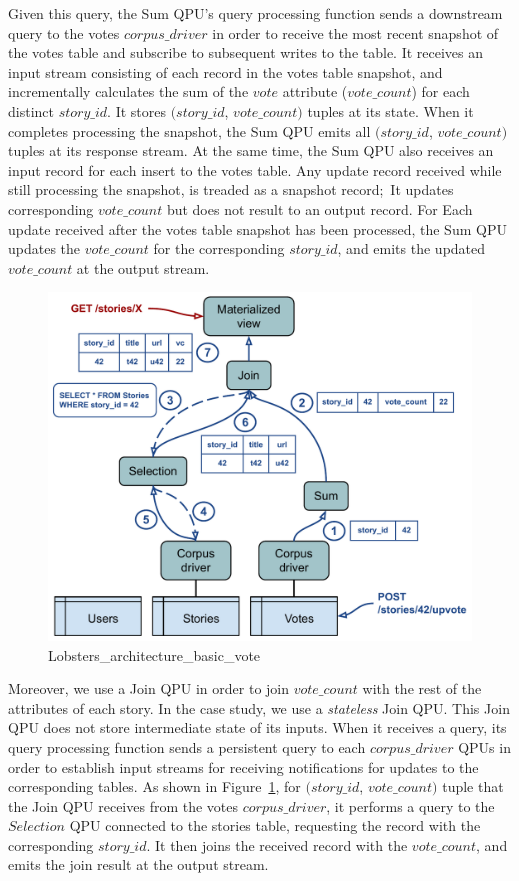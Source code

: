 Given this query, the Sum QPU's query processing function sends a downstream query to the votes $corpus\_driver$
in order to receive the most recent snapshot of the votes table
and subscribe to subsequent writes to the table.
It receives an input stream consisting of each record in the votes table snapshot,
and incrementally calculates the sum of the $vote$ attribute ($vote\_count$) for each distinct $story\_id$.
It stores $(story\_id$, $vote\_count)$ tuples at its state.
When it completes processing the snapshot, the Sum QPU emits all $(story\_id$, $vote\_count)$ tuples at its response stream.
At the same time, the Sum QPU also receives an input record for each insert to the votes table.
Any update record received while still processing the snapshot, is treaded as a snapshot record;\
It updates corresponding $vote\_count$ but does not result to an output record.
For Each update received after the votes table snapshot has been processed, the Sum QPU updates the $vote\_count$ for the
corresponding $story\_id$,
and emits the updated $vote\_count$ at the output stream.

\begin{figure}[t]
  \centering
    \includegraphics[scale=0.5]{./figures/case_studies/lobsters_architecture_basic_vote.pdf}
  \caption{Lobsters\_architecture\_basic\_vote}
  \label{fig:lobsters_architecture_basic_vote}
\end{figure}

\medskip
\noindent
Moreover, we use a Join QPU in order to join $vote\_count$ with the rest of the attributes of each story.
In the case study, we use a \textit{stateless} Join QPU.
This Join QPU does not store intermediate state of its inputs.
When it receives a query,
its query processing function sends a persistent query to each $corpus\_driver$ QPUs in order to establish input streams
for receiving notifications for updates to the corresponding tables.
As shown in Figure~\ref{fig:lobsters_architecture_basic_vote},
for $(story\_id$, $vote\_count)$ tuple that the Join QPU receives from the votes $corpus\_driver$,
it performs a query to the $Selection$ QPU connected to the stories table, requesting the record with the corresponding $story\_id$.
It then joins the received record with the $vote\_count$, and emits the join result at the output stream.

